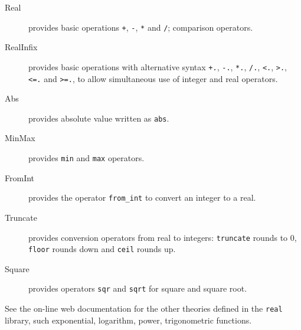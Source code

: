 \begin{description}

\item[Real] provides basic operations \verb|+|, \verb|-|, \verb|*| and \verb|/|;
  comparison operators.

\item[RealInfix] provides basic operations with alternative syntax \verb|+.|,
  \verb|-.|, \verb|*.|, \verb|/.|, \verb|<.|, \verb|>.|, \verb|<=.| and \verb|>=.|, to
  allow simultaneous use of integer and real operators.

\item[Abs] provides absolute value written as \verb|abs|.

\item[MinMax] provides \verb|min| and \verb|max| operators.

\item[FromInt] provides the operator \verb|from_int| to convert an integer to a real.

\item[Truncate] provides conversion operators from real to integers:
  \verb|truncate| rounds to 0, \verb|floor| rounds down and
  \verb|ceil| rounds up.

\item[Square] provides operators \verb|sqr| and \verb|sqrt| for square and square root.







\end{description}

See the on-line web documentation for the other theories defined in the
\texttt{real} library, such exponential, logarithm, power,
trigonometric functions.

